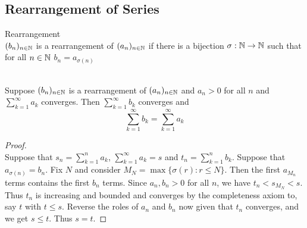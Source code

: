 \documentclass[a4paper]{article}
\begin{document}
\subsection{Rearrangement of Series}
\begin{defn}{Rearrangement}{}\\ $(b_n)_{n\in\mathbb{N}}$ is a rearrangement of $(a_n)_{n\in\mathbb{N}}$ if there is a bijection $\sigma:\mathbb{N}\to\mathbb{N}$ such that for all $n\in\mathbb{N}$ $b_n=a_{\sigma(n)}$
\end{defn}

\begin{thm}{}{}\\ Suppose $(b_n)_{n\in\mathbb{N}}$ is a rearrangement of $(a_n)_{n\in\mathbb{N}}$ and $a_n>0$ for all $n$ and $\sum_{k=1}^{\infty}a_k$ converges. Then $\sum_{k=1}^{\infty}b_k$ converges and $$\sum_{k=1}^{\infty}b_k=\sum_{k=1}^{\infty}a_k$$ 
\begin{proof}\\ Suppose that $s_n=\sum_{k=1}^{n}a_k$, $\sum_{k=1}^{\infty}a_k=s$ and $t_n=\sum_{k=1}^{n}b_k$. Suppose that $a_{\sigma(n)}=b_n$. Fix $N$ and consider $M_N=\max\{\sigma(r):r\leq N\}$. Then the first $a_{M_n}$ terms contains the first $b_n$ terms. Since $a_n,b_n>0$ for all $n$, we have $t_n<s_{M_N}<s$. Thus $t_n$ is increasing and bounded and converges by the completeness axiom to, say $t$ with $t\leq s$. Reverse the roles of $a_n$ and $b_n$ now given that $t_n$ converges, and we get $s\leq t$. Thus $s=t$. 
\end{proof}
\end{thm}
\end{document}
